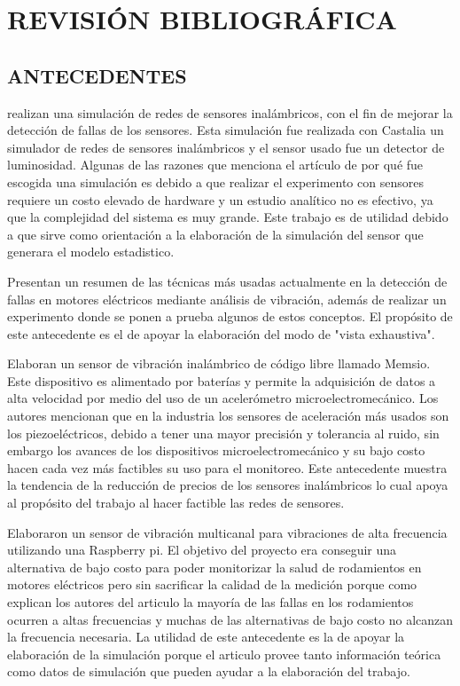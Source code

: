 \thispagestyle{empty}

\section{REVISIÓN BIBLIOGRÁFICA}

\subsection{ANTECEDENTES}

\textcite{Pinto} realizan una simulación de redes de sensores inalámbricos, con
el fin de mejorar la detección de fallas de los sensores. Esta simulación fue
realizada con Castalia un simulador de redes de sensores inalámbricos y el
sensor usado fue un detector de luminosidad. Algunas de las razones que
menciona el artículo de por qué fue escogida una simulación es debido a que
realizar el experimento con sensores requiere un costo elevado de hardware y un
estudio analítico no es efectivo, ya que la complejidad del sistema es muy
grande. Este trabajo es de utilidad debido a que sirve como orientación a la
elaboración de la simulación del sensor que generara el modelo estadistico.

\textcite{Ugwiri} Presentan un resumen de las técnicas más usadas actualmente
en la detección de fallas en motores eléctricos mediante análisis de vibración,
además de realizar un experimento donde se ponen a prueba algunos de estos
conceptos. El propósito de este antecedente es el de apoyar la elaboración del
modo de "vista exhaustiva".

\textcite{Koene} Elaboran un sensor de vibración inalámbrico de código libre
llamado Memsio. Este dispositivo es alimentado por baterías y permite la
adquisición de datos a alta velocidad por medio del uso de un acelerómetro
microelectromecánico. Los autores mencionan que en la industria los sensores de
aceleración más usados son los piezoeléctricos, debido a tener una mayor
precisión y tolerancia al ruido, sin embargo los avances de los dispositivos
microelectromecánico y su bajo costo hacen cada vez más factibles su uso para
el monitoreo. Este antecedente muestra la tendencia de la reducción de precios
de los sensores inalámbricos lo cual apoya al propósito del trabajo al hacer
factible las redes de sensores.

\textcite{Soto-Ocampo} Elaboraron un sensor de vibración multicanal para
vibraciones de alta frecuencia utilizando una Raspberry pi. El objetivo del
proyecto era conseguir una alternativa de bajo costo para poder monitorizar
la salud de rodamientos en motores eléctricos pero sin sacrificar la calidad de
la medición porque como explican los autores del articulo la mayoría de las
fallas en los rodamientos ocurren a altas frecuencias y muchas de las
alternativas de bajo costo no alcanzan la frecuencia necesaria. La utilidad de
este antecedente es la de apoyar la elaboración de la simulación porque el
articulo provee tanto información teórica como datos de simulación que pueden
ayudar a la elaboración del trabajo.

